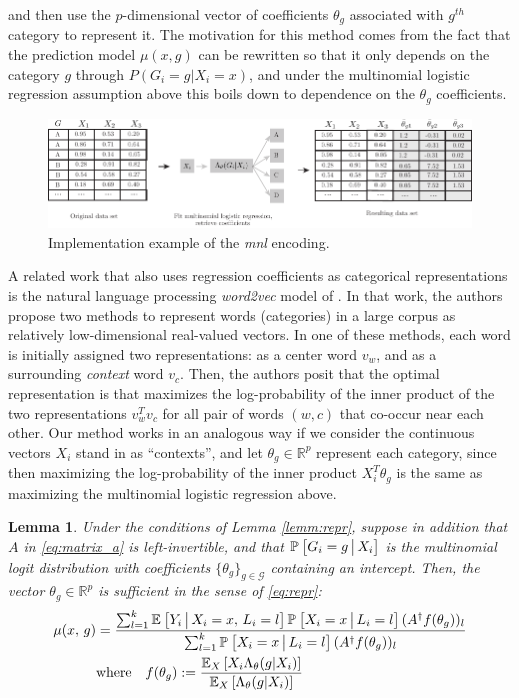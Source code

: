 \documentclass{article}
\theoremstyle{plain}
\newtheorem{lemm}[prop]{Lemma}
\theoremstyle{definition}
\theoremstyle{remark}
\begin{document}
\noindent and then use the $p$-dimensional vector of coefficients $\theta_{g}$ associated with $g^{th}$ category to represent it. The motivation for this method comes from the fact that the prediction model $\mu(x, g)$ can be rewritten so that it only depends on the category $g$ through $P(G_{i}=g|X_{i}=x)$, and under the  multinomial logistic regression assumption above this boils down to dependence on the $\theta_{g}$ coefficients.

\begin{figure}[H]
  \centering
  \includegraphics[width=\textwidth]{figures/mnl.pdf}
  \caption{Implementation example of the \emph{mnl} encoding.}
  \label{fig:lowrank_encoding}
\end{figure}


A related work that also uses regression coefficients as categorical representations is the natural language processing \emph{word2vec} model of \cite{mikolov2013efficient}. In that work, the authors propose two methods to represent words (categories) in a large corpus as relatively low-dimensional real-valued vectors. In one of these methods, each word is initially assigned two representations: as a center word $v_{w}$, and as a surrounding \emph{context} word $v_{c}$. Then, the authors posit that the optimal representation is that maximizes the log-probability of the inner product of the two representations $v_{w}^{T}v_{c}$ for all pair of words $(w, c)$ that co-occur near each other. Our method works in an analogous way if we consider the continuous vectors $X_{i}$ stand in as ``contexts'', and let $\theta_{g} \in \mathbb{R}^{p}$ represent each category, since then maximizing the log-probability of the inner product $X_{i}^{T}\theta_{g}$ is the same as maximizing the multinomial logistic regression above.


\begin{lemm}
\label{lemm:mnl}
Under the conditions of Lemma \ref{lemm:repr}, suppose in addition that $A$ in \eqref{eq:matrix_a} is left-invertible, and that $\PP{ G_{i}=g \cond X_{i}}$ is the multinomial logit distribution with coefficients $\{\theta_{g} \}_{g \in \mathcal{G}}$ containing an intercept. Then, the vector $\theta_{g} \in \mathbb{R}^{p}$ is sufficient in the sense of \eqref{eq:repr}:
\begin{align}
\mu(x, \, g) &= \frac{\sum_{l = 1}^k  \EE{Y_i \cond X_i = x, \, L_i = l} \PP{X_i = x \cond L_i = l} (A^\dagger f(\theta_g))_l}
                     {\sum_{l = 1}^k \PP{X_i = x \cond L_i = l} (A^\dagger f(\theta_{g}))_{l} } \\
&\text{where} \quad f(\theta_{g}) := \frac{\EE[X]{ X_{i}\Lambda_{\theta}(g|X_{i})}}{\EE[X]{\Lambda_{\theta}(g|X_{i})}}
\end{align}
\end{lemm}
\end{document}
